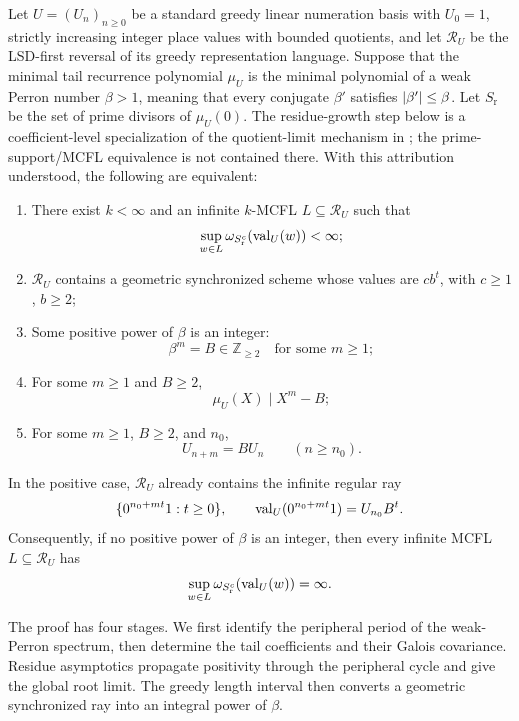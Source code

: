 \begin{theorem}
  \label{cor:linear-perron-bounded-support-classification}
  Let \(U=(U_n)_{n\ge0}\) be a standard greedy linear numeration basis with
  \(U_0=1\), strictly increasing integer place values with bounded
  quotients, and let \(\mathcal R_U\) be the LSD-first reversal of its
  greedy representation language. Suppose that the minimal tail recurrence
  polynomial \(\mu_U\) is the minimal polynomial of a weak Perron number
  \(\beta>1\), meaning that every conjugate \(\beta'\) satisfies
  \(\lvert \beta' \rvert\le\beta\). Let \(S_{\mathrm r}\) be the set of prime
  divisors of \(\mu_U(0)\). The residue-growth step below is a
  coefficient-level specialization of the quotient-limit mechanism in
  \cite[Proposition~10 and Remark~12]{CharlierKreczman2025}; the
  prime-support/MCFL equivalence is not contained there. With this
  attribution understood, the following are equivalent:
  \begin{enumerate}[label=\textup{(\roman*)}]
    \item There exist \(k<\infty\) and an infinite \(k\)-MCFL
    \(L\subseteq\mathcal R_U\) such that
    \[
      \sup_{w\in L}\omega_{S_{\mathrm r}^c}(\operatorname{val}_U(w))<\infty;
    \]
    \item \(\mathcal R_U\) contains a geometric synchronized scheme whose
    values are \(cb^t\), with \(c\ge1\), \(b\ge2\);
    \item Some positive power of \(\beta\) is an integer:
    \[
      \beta^m=B\in\mathbb Z_{\ge2}
      \quad\text{for some }m\ge1;
    \]
    \item For some \(m\ge1\) and \(B\ge2\),
    \[
      \mu_U(X)\mid X^m-B;
    \]
    \item For some \(m\ge1\), \(B\ge2\), and \(n_0\),
    \[
      U_{n+m}=BU_n\qquad(n\ge n_0).
    \]
  \end{enumerate}
  In the positive case, \(\mathcal R_U\) already contains the infinite
  regular ray
  \[
    \{0^{n_0+mt}1:t\ge0\},\qquad
    \operatorname{val}_U(0^{n_0+mt}1)=U_{n_0}B^t.
  \]
  Consequently, if no positive power of \(\beta\) is an integer, then every
  infinite MCFL \(L\subseteq\mathcal R_U\) has
  \[
    \sup_{w\in L}\omega_{S_{\mathrm r}^c}(\operatorname{val}_U(w))=\infty.
  \]
\end{theorem}

The proof has four stages. We first identify the peripheral period of the
weak-Perron spectrum, then determine the tail coefficients and their Galois
covariance. Residue asymptotics propagate positivity through the peripheral
cycle and give the global root limit. The greedy length interval then
converts a geometric synchronized ray into an integral power of \(\beta\).

